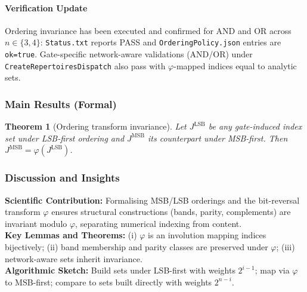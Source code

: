 \documentclass[11pt]{article}
\newtheorem{theorem}{Theorem}
\begin{document}
\paragraph{Verification Update} Ordering invariance has been executed and confirmed for AND and OR across \(n\in\{3,4\}\): \texttt{Status.txt} reports PASS and \texttt{OrderingPolicy.json} entries are \texttt{ok=true}. Gate-specific network-aware validations (AND/OR) under \texttt{CreateRepertoiresDispatch} also pass with \(\varphi\)-mapped indices equal to analytic sets.
\subsubsection*{Main Results (Formal)}
\begin{theorem}[Ordering transform invariance]
Let \(J^{\mathrm{LSB}}\) be any gate-induced index set under LSB-first ordering and \(J^{\mathrm{MSB}}\) its counterpart under MSB-first. Then \(J^{\mathrm{MSB}}=\varphi(J^{\mathrm{LSB}})\).
\end{theorem}
\subsubsection*{Discussion and Insights}
\textbf{Scientific Contribution:} Formalising MSB/LSB orderings and the bit-reversal transform \(\varphi\) ensures structural constructions (bands, parity, complements) are invariant modulo \(\varphi\), separating numerical indexing from content.\\
\textbf{Key Lemmas and Theorems:} (i) \(\varphi\) is an involution mapping indices bijectively; (ii) band membership and parity classes are preserved under \(\varphi\); (iii) network-aware sets inherit invariance.\\
\textbf{Algorithmic Sketch:} Build sets under LSB-first with weights \(2^{i-1}\); map via \(\varphi\) to MSB-first; compare to sets built directly with weights \(2^{n-i}\).
\end{document}
